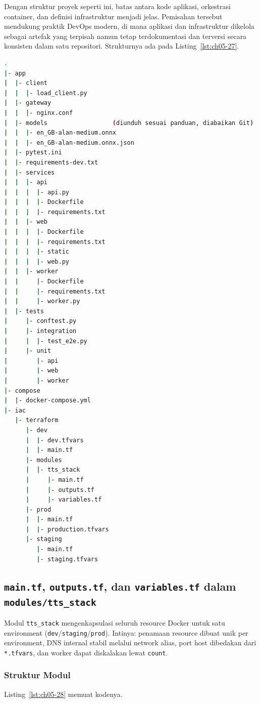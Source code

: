 Dengan struktur proyek seperti ini, batas antara kode aplikasi, orkestrasi container, dan definisi infrastruktur menjadi jelas. Pemisahan tersebut mendukung praktik DevOps modern, di mana aplikasi dan infrastruktur dikelola sebagai artefak yang terpisah namun tetap terdokumentasi dan terversi secara konsisten dalam satu repositori. Strukturnya ada pada Listing~\ref{lst:ch05-27}.


\begin{lstlisting}[language=bash, caption={Struktur proyek menggunakan Terraform}, label={lst:ch05-27}]
.
|- app
|  |- client
|  |  |- load_client.py
|  |- gateway
|  |  |- nginx.conf
|  |- models                  (diunduh sesuai panduan, diabaikan Git)
|  |  |- en_GB-alan-medium.onnx
|  |  |- en_GB-alan-medium.onnx.json
|  |- pytest.ini
|  |- requirements-dev.txt
|  |- services
|  |  |- api
|  |  |  |- api.py
|  |  |  |- Dockerfile
|  |  |  |- requirements.txt
|  |  |- web
|  |  |  |- Dockerfile
|  |  |  |- requirements.txt
|  |  |  |- static
|  |  |  |- web.py
|  |  |- worker
|  |     |- Dockerfile
|  |     |- requirements.txt
|  |     |- worker.py
|  |- tests
|     |- conftest.py
|     |- integration
|     |  |- test_e2e.py
|     |- unit
|        |- api
|        |- web
|        |- worker
|- compose
|  |- docker-compose.yml
|- iac
   |- terraform
      |- dev
      |  |- dev.tfvars
      |  |- main.tf
      |- modules
      |  |- tts_stack
      |	    |- main.tf
      |	    |- outputs.tf
      |	    |- variables.tf
      |- prod
      |  |- main.tf
      |  |- production.tfvars
      |- staging
         |- main.tf
         |- staging.tfvars
\end{lstlisting}

\subsection[main.tf, outputs.tf, dan variables.tf]{\texttt{main.tf}, \texttt{outputs.tf}, dan \texttt{variables.tf} dalam \texttt{modules/tts\_stack}}

Modul \texttt{tts\_stack} mengenkapsulasi seluruh resource Docker untuk satu environment (\texttt{dev}/\texttt{staging}/\texttt{prod}). Intinya: penamaan resource dibuat unik per environment, DNS internal stabil melalui network alias, port host dibedakan dari \texttt{*.tfvars}, dan worker dapat diskalakan lewat \texttt{count}.

\subsubsection{Struktur Modul} Listing~\ref{lst:ch05-28} memuat kodenya.

